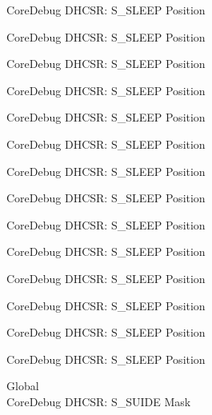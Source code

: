 \begin{DoxyRefList}
\label{deprecated__deprecated000169}%
%
Core\+Debug DHCSR\+: S\+\_\+\+SLEEP Position 

\label{deprecated__deprecated000254}%
%
Core\+Debug DHCSR\+: S\+\_\+\+SLEEP Position 

\label{deprecated__deprecated000311}%
%
Core\+Debug DHCSR\+: S\+\_\+\+SLEEP Position 

\label{deprecated__deprecated000387}%
%
Core\+Debug DHCSR\+: S\+\_\+\+SLEEP Position 

\label{deprecated__deprecated000474}%
%
Core\+Debug DHCSR\+: S\+\_\+\+SLEEP Position 

\label{deprecated__deprecated000576}%
%
Core\+Debug DHCSR\+: S\+\_\+\+SLEEP Position 

\label{deprecated__deprecated000701}%
%
Core\+Debug DHCSR\+: S\+\_\+\+SLEEP Position 

\label{deprecated__deprecated000793}%
%
Core\+Debug DHCSR\+: S\+\_\+\+SLEEP Position 

\label{deprecated__deprecated000847}%
%
Core\+Debug DHCSR\+: S\+\_\+\+SLEEP Position 

\label{deprecated__deprecated000932}%
%
Core\+Debug DHCSR\+: S\+\_\+\+SLEEP Position 

\label{deprecated__deprecated000989}%
%
Core\+Debug DHCSR\+: S\+\_\+\+SLEEP Position 

\label{deprecated__deprecated001065}%
%
Core\+Debug DHCSR\+: S\+\_\+\+SLEEP Position 

\label{deprecated__deprecated001152}%
%
Core\+Debug DHCSR\+: S\+\_\+\+SLEEP Position 

\label{deprecated__deprecated001254}%
%
Core\+Debug DHCSR\+: S\+\_\+\+SLEEP Position  
\item[Global \doxylink{group___c_m_s_i_s___s_c_b_gad37656791dbb216ffb194995f28c412c}{Core\+Debug\+\_\+\+DHCSR\+\_\+\+S\+\_\+\+SUIDE\+\_\+\+Msk} ]\hfill \\
\label{deprecated__deprecated000016}%
%
Core\+Debug DHCSR\+: S\+\_\+\+SUIDE Mask 


\end{DoxyRefList}
